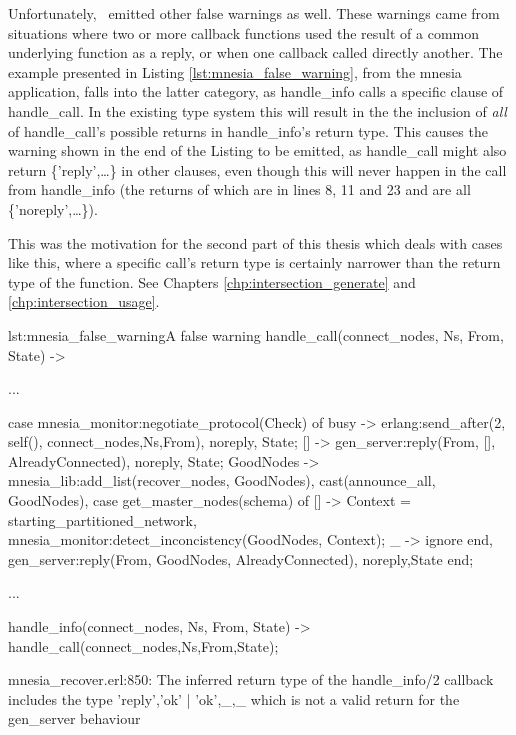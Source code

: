Unfortunately, \dr\ emitted other false warnings as well. These
warnings came from situations where two or more callback functions
used the result of a common underlying function as a reply, or when
one callback called directly another. The example presented in Listing
\ref{lst:mnesia_false_warning}, from the mnesia application, falls
into the latter category, as handle\_info calls a specific clause of
handle\_call. In the existing type system this will result in the the
inclusion of \emph{all} of handle\_call's possible returns in
handle\_info's return type. This causes the warning shown in the end
of the Listing to be emitted, as handle\_call might also return
\{'reply',\ldots\} in other clauses, even though this will never
happen in the call from handle\_info (the returns of which are in
lines 8, 11 and 23 and are all \{'noreply',\ldots\}).

This was the motivation for the second part of this thesis which deals
with cases like this, where a specific call's return type is certainly
narrower than the return type of the function. See
Chapters \ref{chp:intersection_generate}
and \ref{chp:intersection_usage}.

\begin{code}{lst:mnesia_false_warning}{A false warning}
handle_call({connect_nodes, Ns}, From, State) ->
    
    ...

    case mnesia_monitor:negotiate_protocol(Check) of
	busy -> 
	    erlang:send_after(2, self(), {connect_nodes,Ns,From}),
	    {noreply, State};
	[] ->
	    gen_server:reply(From, {[], AlreadyConnected}),
	    {noreply, State};
	GoodNodes ->
	    mnesia_lib:add_list(recover_nodes, GoodNodes),
	    cast({announce_all, GoodNodes}),
	    case get_master_nodes(schema) of 
		[] ->
		    Context = starting_partitioned_network,
		    mnesia_monitor:detect_inconcistency(GoodNodes, Context);
		_ -> %
		    ignore
	    end,
	    gen_server:reply(From, {GoodNodes, AlreadyConnected}),
	    {noreply,State}
    end;

...

handle_info({connect_nodes, Ns, From}, State) ->
    handle_call({connect_nodes,Ns},From,State);


mnesia_recover.erl:850: The inferred return type of the handle_info/2
callback includes the type {'reply','ok' | {'ok',_},_} which is not a
valid return for the gen_server behaviour

\end{code}

